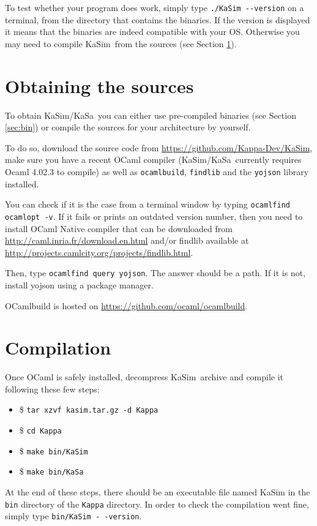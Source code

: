 \documentclass[11pt]{book}
\def\KaSim{\textsf{KaSim}}
\def\KaSa{\textsf{KaSa}}
\def\ttt#1{\texttt{#1}}
\def\ITE#1{\begin{itemize}#1\end{itemize}}
\def\dd{-\hspace{0.001cm}-}
\begin{document}
To test whether your program does work, simply type \ttt{./KaSim \dd version} on a terminal, from the directory that contains the binaries. If the version is displayed it means that the binaries are indeed compatible with your OS. Otherwise you may need to compile \KaSim~from the sources (see Section \ref{sec:sources}).

\section{Obtaining the sources}\label{sec:sources}
To obtain \KaSim/\KaSa~you can either use pre-compiled binaries (see
Section \ref{sec:bin}) or compile the sources for your
architecture by yourself.

To do so, download the source code from
\url{https://github.com/Kappa-Dev/KaSim}, make sure you have a recent
OCaml compiler (\KaSim/\KaSa~currently requires Ocaml 4.02.3 to
compile) as well as \ttt{ocamlbuild}, \ttt{findlib} and the
\ttt{yojson} library installed.

You can check if it is the case from a terminal window by typing
\ttt{ocamlfind ocamlopt -v}. If it fails or prints an outdated version number, then you need to install OCaml Native compiler that can be
downloaded from \url{http://caml.inria.fr/download.en.html} and/or
findlib available at
\url{http://projects.camlcity.org/projects/findlib.html}.

Then, type \ttt{ocamlfind query yojson}. The answer should be a
path. If it is not, install yojson using a package manager.

OCamlbuild is hosted on \url{https://github.com/ocaml/ocamlbuild}.

\section{Compilation}
Once OCaml is safely installed, decompress \KaSim~archive and compile it following these
few steps: \ITE{
\item[\$]\ttt{tar xzvf kasim.tar.gz -d Kappa}
\item[\$]\ttt{cd Kappa}
\item[\$]\ttt{make bin/KaSim}
\item[\$]\ttt{make bin/KaSa}}

At the end of these steps, there should be an executable file named
KaSim  in the \ttt{bin} directory of the \ttt{Kappa} directory.  In order to check the compilation went fine, simply type
\ttt{bin/KaSim -\,-version}.
\end{document}
